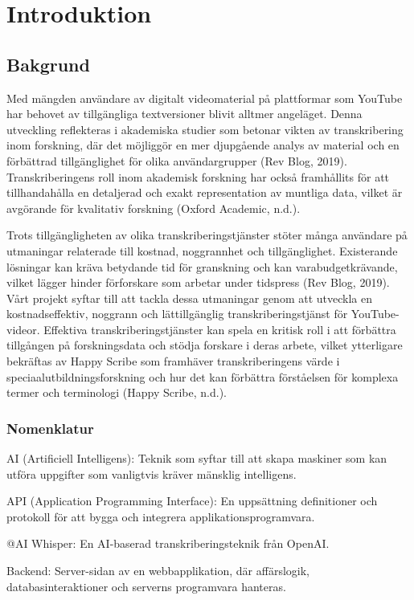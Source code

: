 \chapter{Introduktion}

\section{Bakgrund}
Med mängden användare av digitalt videomaterial på plattformar som YouTube har behovet av tillgängliga textversioner blivit alltmer angeläget. Denna utveckling reflekteras i akademiska studier som betonar vikten av transkribering inom forskning, där det möjliggör en mer djupgående analys av material och en förbättrad tillgänglighet för olika användargrupper (Rev Blog, 2019). Transkriberingens roll inom akademisk forskning har också framhållits för att tillhandahålla en detaljerad och exakt representation av muntliga data, vilket är avgörande för kvalitativ forskning (Oxford Academic, n.d.).

Trots tillgängligheten av olika transkriberingstjänster stöter många användare på utmaningar relaterade till kostnad, noggrannhet och tillgänglighet. Existerande lösningar kan kräva betydande tid för granskning och kan varabudgetkrävande, vilket lägger hinder förforskare som arbetar under tidspress (Rev Blog, 2019). Vårt projekt syftar till att tackla dessa utmaningar genom att utveckla en kostnadseffektiv, noggrann och lättillgänglig transkriberingstjänst för YouTube-videor. Effektiva transkriberingstjänster kan spela en kritisk roll i att förbättra tillgången på forskningsdata och stödja forskare i deras arbete, vilket ytterligare bekräftas av Happy Scribe som framhäver transkriberingens värde i speciaalutbildningsforskning och hur det kan förbättra förståelsen för komplexa termer och terminologi (Happy Scribe, n.d.).

\subsection{Nomenklatur}
AI (Artificiell Intelligens): Teknik som syftar till att skapa maskiner som kan utföra uppgifter som vanligtvis kräver mänsklig intelligens.

API (Application Programming Interface): En uppsättning definitioner och protokoll för att bygga och integrera applikationsprogramvara.

@AI Whisper: En AI-baserad transkriberingsteknik från OpenAI.

Backend: Server-sidan av en webbapplikation, där affärslogik, databasinteraktioner och serverns programvara hanteras.

